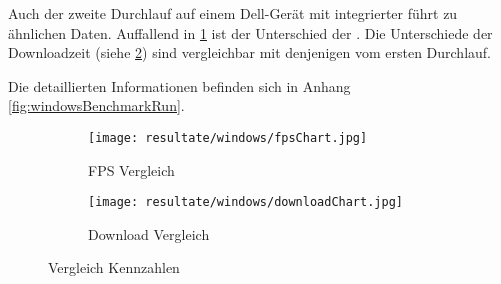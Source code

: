 Auch der zweite Durchlauf auf einem Dell-Gerät mit integrierter  führt zu ähnlichen Daten. Auffallend in \ref{fig:benchmarkFpsChartWindows} ist der Unterschied der . Die Unterschiede der Downloadzeit (siehe \ref{fig:benchmarkDownloadChartWindows}) sind vergleichbar mit denjenigen vom ersten Durchlauf.

Die detaillierten Informationen befinden sich in Anhang \ref{fig:windowsBenchmarkRun}.

\begin{figure}[H]
  \centering
  \begin{subfigure}{.49\textwidth}
    \centering
    \texttt{[image: resultate/windows/fpsChart.jpg]}
    \caption{FPS Vergleich}
    \label{fig:benchmarkFpsChartWindows}
  \end{subfigure}
  \begin{subfigure}{.49\textwidth}
    \centering
    \texttt{[image: resultate/windows/downloadChart.jpg]}
    \caption{Download Vergleich}
    \label{fig:benchmarkDownloadChartWindows}
  \end{subfigure}
  \caption{Vergleich Kennzahlen}
  \label{fig:benchmarkChartWindows}
\end{figure}
